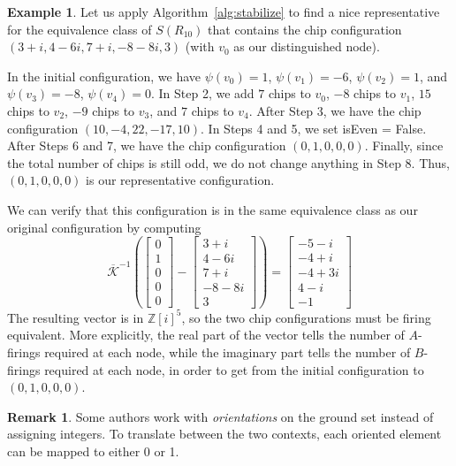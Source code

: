 \documentclass[12p]{amsart}
\numberwithin{equation}{section}
\theoremstyle{plain}
\theoremstyle{definition}
\newtheorem{remark}[thm]{Remark}
\newtheorem{example}[thm]{Example}
\newcommand{\Z}{\mathbb {Z}}
\begin{document}
\begin{example}
    Let us apply Algorithm~\ref{alg:stabilize} to find a nice representative for the equivalence class of $S(R_{10})$ that contains the chip configuration $(3+i, 4-6i, 7+i, -8-8i, 3)$ (with $v_0$ as our distinguished node). 

    In the initial configuration, we have $\psi(v_0) = 1$, $\psi(v_1) = -6$, $\psi(v_2) = 1$, and $\psi(v_3) = -8$, $\psi(v_4) = 0$. In Step 2, we add $7$ chips to $v_0$, $-8$ chips to $v_1$, $15$ chips to $v_2$, $-9$ chips to $v_3$, and $7$ chips to $v_4$. After Step 3, we have the chip configuration $(10,-4,22,-17,10)$. In Steps 4 and 5, we set isEven = False. After Steps 6 and 7, we have the chip configuration $(0, 1, 0, 0, 0)$. Finally, since the total number of chips is still odd, we do not change anything in Step 8. Thus, $(0, 1, 0, 0, 0)$ is our representative configuration. 

    We can verify that this configuration is in the same equivalence class as our original configuration by computing 
    \[ \overline{\mathcal K}^{-1}\left (\begin{bmatrix} 0 \\ 1 \\ 0 \\ 0 \\ 0\end{bmatrix}-\begin{bmatrix} 3+i \\ 4 - 6i \\ 7+i \\ -8-8i \\ 3\end{bmatrix}\right ) = \begin{bmatrix} -5 - i \\ -4 + i \\ -4 + 3i \\ 4 - i\\ -1\end{bmatrix}\]
    The resulting vector is in $\Z[i]^5$, so the two chip configurations must be firing equivalent. More explicitly, the real part of the vector tells the number of $A$-firings required at each node, while the imaginary part tells the number of $B$-firings required at each node, in order to get from the initial configuration to $(0,1,0,0,0)$. 
\end{example}

\begin{remark}
    Some authors work with \emph{orientations} on the ground set instead of assigning integers. To translate between the two contexts, each oriented element can be mapped to either 0 or 1. 
\end{remark}
\end{document}
